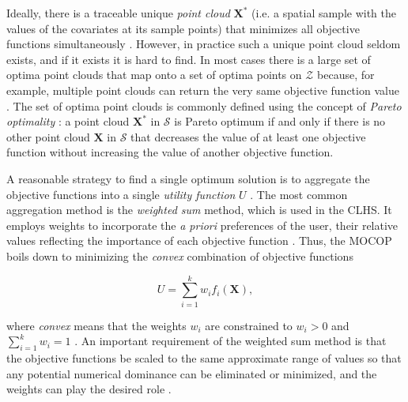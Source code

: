 Ideally, there is a traceable unique \emph{point cloud} $\boldsymbol{X}^*$ (i.e. a spatial sample with the 
values of the covariates at its sample points) that minimizes all objective functions simultaneously 
\cite{MarlerEtAl2009}. However, in practice such a unique point cloud seldom exists, and if it exists it is 
hard to find. In most cases there is a large set of optima point clouds that map onto a set of optima points 
on $\mathcal{Z}$ because, for example, multiple point clouds can return the very same objective function value 
\cite{Arora2011}. The set of optima point clouds is commonly defined using the concept of \emph{Pareto 
optimality} \cite{MarlerEtAl2004}: a point cloud $\boldsymbol{X}^*$ in $\mathcal{S}$ is Pareto optimum if and 
only if there is no other point cloud $\boldsymbol{X}$ in $\mathcal{S}$ that decreases the value of at least 
one objective function without increasing the value of another objective function.

A reasonable strategy to find a single optimum solution is to aggregate the objective functions into a single 
\emph{utility function} $U$ \cite{MarlerEtAl2005}. The most common aggregation method is the \emph{weighted 
sum} method, which is used in the CLHS. It employs weights to incorporate the \emph{a priori} preferences of 
the user, their relative values reflecting the importance of each objective function \cite{MarlerEtAl2009}. 
Thus, the MOCOP boils down to minimizing the \emph{convex} combination of objective functions

\begin{equation}\label{eqn:chap08-utility}
 U = \sum_{i=1}^{k} w_i f_i(\boldsymbol{X}),
\end{equation}

\noindent where \emph{convex} means that the weights $w_i$ are constrained to $w_i > 0$ and $\sum_{i=1}^{k} w_i 
= 1$ \cite{MarlerEtAl2005, MarlerEtAl2009}. An important requirement of the weighted sum method is that the 
objective functions be scaled to the same approximate range of values so that any potential numerical dominance 
can be eliminated or minimized, and the weights can play the desired role \cite{MarlerEtAl2005, 
MarlerEtAl2009}. 

